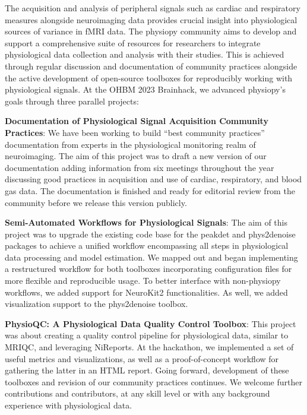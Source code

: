 \documentclass{article}
\begin{document}
The acquisition and analysis of peripheral signals such as cardiac and respiratory measures alongside neuroimaging data provides crucial insight into physiological sources of variance in fMRI data. The physiopy community aims to develop and support a comprehensive suite of resources for researchers to integrate physiological data collection and analysis with their studies. This is achieved through regular discussion and documentation of community practices alongside the active development of open-source toolboxes for reproducibly working with physiological signals. At the OHBM 2023 Brainhack, we advanced physiopy’s goals through three parallel projects:

\textbf{Documentation of Physiological Signal Acquisition Community Practices}: We have been working to build “best community practices” documentation from experts in the physiological monitoring realm of neuroimaging. The aim of this project was to draft a new version of our documentation adding information from six meetings throughout the year discussing good practices in acquisition and use of cardiac, respiratory, and blood gas data. The documentation is finished and ready for editorial review from the community before we release this version publicly.

\textbf{Semi-Automated Workflows for Physiological Signals}: The aim of this project was to upgrade the existing code base for the peakdet and phys2denoise packages to achieve a unified workflow encompassing all steps in physiological data processing and model estimation. We mapped out and began implementing a restructured workflow for both toolboxes incorporating configuration files for more flexible and reproducible usage. To better interface with non-physiopy workflows, we added support for NeuroKit2 functionalities. As well, we added visualization support to the phys2denoise toolbox.

\textbf{PhysioQC: A Physiological Data Quality Control Toolbox}: This project was about creating a quality control pipeline for physiological data, similar to MRIQC, and leveraging NiReports. At the hackathon, we implemented a set of useful metrics and visualizations, as well as a proof-of-concept workflow for gathering the latter in an HTML report.
Going forward, development of these toolboxes and revision of our community practices continues. We welcome further contributions and contributors, at any skill level or with any background experience with physiological data.
\end{document}
